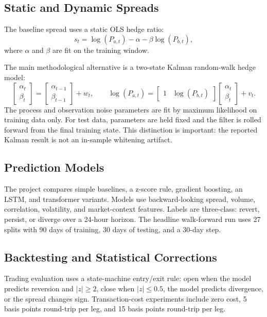 \documentclass[11pt]{article}
\begin{document}
\subsection{Static and Dynamic Spreads}

The baseline spread uses a static OLS hedge ratio:
\[
s_t = \log(P_{a,t}) - \alpha - \beta \log(P_{b,t}),
\]
where \(\alpha\) and \(\beta\) are fit on the training window.

The main methodological alternative is a two-state Kalman random-walk hedge
model:
\[
\begin{bmatrix}\alpha_t\\ \beta_t\end{bmatrix}
=
\begin{bmatrix}\alpha_{t-1}\\ \beta_{t-1}\end{bmatrix}
+ w_t,
\qquad
\log(P_{a,t}) =
\begin{bmatrix}1 & \log(P_{b,t})\end{bmatrix}
\begin{bmatrix}\alpha_t\\ \beta_t\end{bmatrix}
+ v_t.
\]
The process and observation noise parameters are fit by maximum likelihood on
training data only. For test data, parameters are held fixed and the filter is
rolled forward from the final training state. This distinction is important:
the reported Kalman result is not an in-sample whitening artifact.

\subsection{Prediction Models}

The project compares simple baselines, a z-score rule, gradient boosting, an
LSTM, and transformer variants. Models use backward-looking spread, volume,
correlation, volatility, and market-context features. Labels are three-class:
revert, persist, or diverge over a 24-hour horizon. The headline walk-forward
run uses 27 splits with 90 days of training, 30 days of testing, and a 30-day
step.

\subsection{Backtesting and Statistical Corrections}

Trading evaluation uses a state-machine entry/exit rule: open when the model
predicts reversion and \(|z|\geq 2\), close when \(|z|\leq 0.5\), the model
predicts divergence, or the spread changes sign. Transaction-cost experiments
include zero cost, 5 basis points round-trip per leg, and 15 basis points
round-trip per leg.
\end{document}

